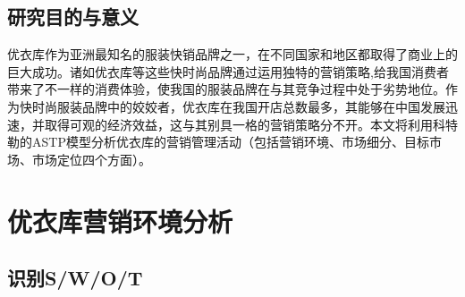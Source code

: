 \documentclass{xjtureport}
\begin{document}
\subsection{研究目的与意义}
优衣库作为亚洲最知名的服装快销品牌之一，在不同国家和地区都取得了商业上的巨大成功。诸如优衣库等这些快时尚品牌通过运用独特的营销策略,给我国消费者带来了不一样的消费体验，使我国的服装品牌在与其竞争过程中处于劣势地位。作为快时尚服装品牌中的姣姣者，优衣库在我国开店总数最多，其能够在中国发展迅速，并取得可观的经济效益，这与其别具一格的营销策略分不开。本文将利用科特勒的ASTP模型分析优衣库的营销管理活动（包括营销环境、市场细分、目标市场、市场定位四个方面）。
\section{优衣库营销环境分析}
\subsection{识别S/W/O/T}
\end{document}
